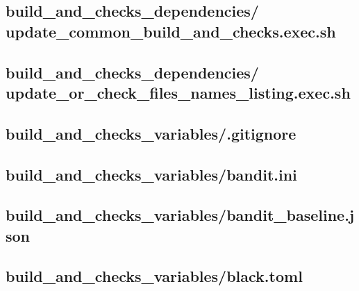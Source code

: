 \documentclass{article}
\begin{document}


\subsection{
  build\_and\_checks\_dependencies/%
update\_common\_build\_and\_checks.exec.sh
}
\label{
  build_and_checks_dependencies:update_common_build_and_checksexecsh
}



\subsection{
  build\_and\_checks\_dependencies/%
update\_or\_check\_files\_names\_listing.exec.sh
}
\label{
  build_and_checks_dependencies:update_or_check_files_names_listingexecsh
}



\subsection{
  build\_and\_checks\_variables/.gitignore
}
\label{
  build_and_checks_variables:gitignore
}



\subsection{
  build\_and\_checks\_variables/bandit.ini
}
\label{
  build_and_checks_variables:banditini
}



\subsection{
  build\_and\_checks\_variables/bandit\_baseline.json
}
\label{
  build_and_checks_variables:bandit_baselinejson
}



\subsection{
  build\_and\_checks\_variables/black.toml
}
\label{
  build_and_checks_variables:blacktoml
}
\end{document}
